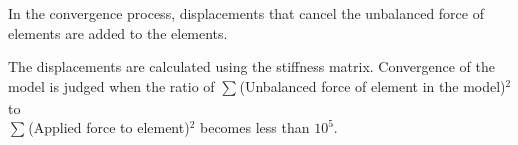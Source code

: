 In the convergence process, displacements that cancel the unbalanced force of elements are added to the elements.

The displacements are calculated using the stiffness matrix. Convergence of the model is judged when the ratio of
$\sum_{} $(Unbalanced force of element in the model)$^2$ to \\
$\sum_{} $(Applied force to element)$^2$ becomes less than $10^5$.



%
%
%
%
%
%
%
%
%
%
%

